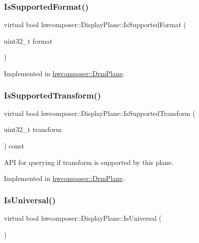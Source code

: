 \subsubsection{\texorpdfstring{Is\+Supported\+Format()}{IsSupportedFormat()}}
{\footnotesize\ttfamily virtual bool hwcomposer\+::\+Display\+Plane\+::\+Is\+Supported\+Format (\begin{DoxyParamCaption}\item[{uint32\+\_\+t}]{format }\end{DoxyParamCaption})\hspace{0.3cm}{\ttfamily [pure virtual]}}



Implemented in \mbox{\hyperlink{classhwcomposer_1_1DrmPlane_a50940fd94a65453bd22d20011581796e}{hwcomposer\+::\+Drm\+Plane}}.

\mbox{\label{classhwcomposer_1_1DisplayPlane_ade9032b0c8991b0e79d321e946c8f625}} 
\subsubsection{\texorpdfstring{Is\+Supported\+Transform()}{IsSupportedTransform()}}
{\footnotesize\ttfamily virtual bool hwcomposer\+::\+Display\+Plane\+::\+Is\+Supported\+Transform (\begin{DoxyParamCaption}\item[{uint32\+\_\+t}]{transform }\end{DoxyParamCaption}) const\hspace{0.3cm}{\ttfamily [pure virtual]}}

A\+PI for querying if transform is supported by this plane. 

Implemented in \mbox{\hyperlink{classhwcomposer_1_1DrmPlane_ac3feae2eaa4adfb5678a47c835c2c2af}{hwcomposer\+::\+Drm\+Plane}}.

\mbox{\label{classhwcomposer_1_1DisplayPlane_a7b374ba9e799f7d0b53afbd939961c51}} 
\subsubsection{\texorpdfstring{Is\+Universal()}{IsUniversal()}}
{\footnotesize\ttfamily virtual bool hwcomposer\+::\+Display\+Plane\+::\+Is\+Universal (\begin{DoxyParamCaption}{ }\end{DoxyParamCaption})\hspace{0.3cm}{\ttfamily [pure virtual]}}

